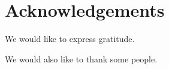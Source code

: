 \chapter*{Acknowledgements}
\thispagestyle{empty}

\vspace{-3cm}
\vfill

\begin{center}
\begin{minipage}{15cm}
We would like to express gratitude.
\newline

We would also like to thank some people.
\end{minipage}
\end{center}

\vfill
